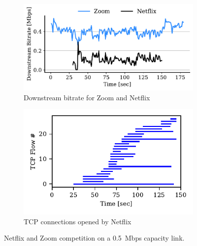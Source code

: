 \begin{figure}[t!]
\centering
\begin{subfigure}[t]{.45\textwidth}
    \centering
    \includegraphics[width=1\textwidth]{figures/comp_ts/zoom_netflix_0.5_dl_r1.pdf}
    \caption{Downstream bitrate for Zoom and Netflix}
    \label{subfig:comp_zoom_netflix_bitrate}
\end{subfigure}\hfill
\begin{subfigure}[t]{.45\textwidth}
    \centering
    \includegraphics[width=1\textwidth]{figures/comp/netflix_connection_0_5.pdf}
    \caption{TCP connections opened by Netflix}
    \label{subfig:comp_netflix_conn}
\end{subfigure}
\caption{Netflix and Zoom competition on a 0.5~Mbps capacity link.}
\label{fig:comp_netflix_zoom}
\end{figure}

